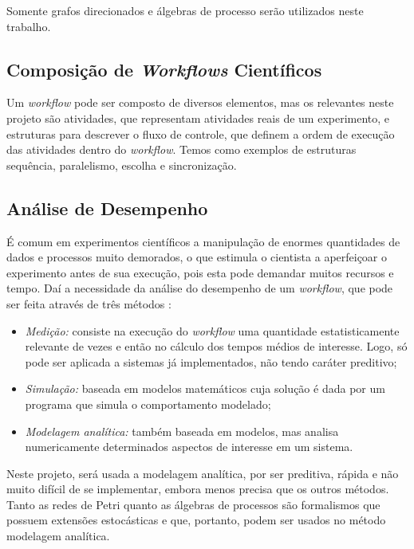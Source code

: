 \documentclass[a4paper,11pt]{article}
\begin{document}
  	Somente grafos direcionados e álgebras de processo serão utilizados neste trabalho.

  	\subsection{Composição de \emph{Workflows} Científicos}
  	Um \emph{workflow} pode ser composto de diversos elementos, mas os relevantes neste projeto são atividades, que representam atividades reais de um experimento, e estruturas para descrever o fluxo de controle, que definem a ordem de execução das atividades dentro do \emph{workflow}. Temos como exemplos de estruturas sequência, paralelismo, escolha e sincronização.


  	\subsection{Análise de Desempenho}
  	É comum em experimentos científicos a manipulação de enormes quantidades de dados e processos muito demorados, o que estimula o cientista a aperfeiçoar o experimento antes de sua execução, pois esta pode demandar muitos recursos e tempo. Daí a necessidade da análise do desempenho de um \emph{workflow}, que pode ser feita através de três métodos \cite{phd:kelly11}:

  	\begin{itemize}
  		\item \emph{Medição:} consiste na execução do \emph{workflow} uma quantidade estatisticamente relevante de vezes e então no cálculo dos tempos médios de interesse. Logo, só pode ser aplicada a sistemas já implementados, não tendo caráter preditivo;

  		\item \emph{Simulação:} baseada em modelos matemáticos cuja solução é dada por um programa que simula o comportamento modelado;

  		\item \emph{Modelagem analítica:} também baseada em modelos, mas analisa numericamente determinados aspectos de interesse em um sistema.
  	\end{itemize}

  	Neste projeto, será usada a modelagem analítica, por ser preditiva, rápida e não muito difícil de se implementar, embora menos precisa que os outros métodos. Tanto as redes de Petri quanto as álgebras de processos são formalismos que possuem extensões estocásticas e que, portanto, podem ser usados no método modelagem analítica. 
\end{document}
